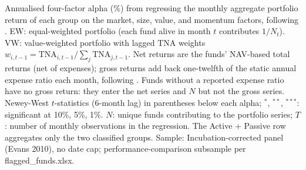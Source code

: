 \begin{table}[!htbp]
\centering
{}
\setlength{\tabletempwidth}{\wd\tabletempbox}
\ifdim\tabletempwidth>\linewidth\setlength{\tabletempwidth}{\linewidth}\fi
\begin{minipage}{\tabletempwidth}
\captionsetup{width=\linewidth}
\caption{\label{tab:perf_aggregate}Aggregate Portfolio Alpha by Group (\%, Annualised)}
\ifdim\wd\tabletempbox>\linewidth
  \resizebox{\linewidth}{!}{\usebox{\tabletempbox}}
\else
  \usebox{\tabletempbox}
\fi
\par\medskip
\begin{singlespace}\footnotesize\noindent
Annualised \textcite{Carhart1997} four-factor alpha (\%) from regressing the monthly aggregate portfolio return of each group on the market, size, value, and momentum factors, following \textcite{FamaFrench2010}. EW: equal-weighted portfolio (each fund alive in month $t$ contributes $1/N_t$). VW: value-weighted portfolio with lagged TNA weights $w_{i,t-1} = \text{TNA}_{i,t-1} / \sum_j \text{TNA}_{j,t-1}$. Net returns are the funds' NAV-based total returns (net of expenses); gross returns add back one-twelfth of the static annual expense ratio each month, following \textcite{FamaFrench2010}. Funds without a reported expense ratio have no gross return: they enter the net series and $N$ but not the gross series. Newey-West $t$-statistics (6-month lag) in parentheses below each alpha; $^{*}$, $^{**}$, $^{***}$: significant at 10\%, 5\%, 1\%. $N$: unique funds contributing to the portfolio series; $T$: number of monthly observations in the regression. The Active + Passive row aggregates only the two classified groups. Sample: Incubation-corrected panel (Evans 2010), no date cap; performance-comparison subsample per flagged\_funds.xlsx.
\end{singlespace}
\end{minipage}
\end{table}

